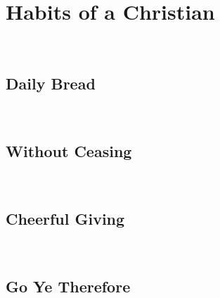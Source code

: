 \section{Habits of a Christian}
\noindent
\blindtext
\\

\subsection{Daily Bread}
\noindent
\blindtext
\\

\subsection{Without Ceasing}
\noindent
\blindtext
\\

\subsection{Cheerful Giving}
\noindent
\blindtext
\\

\subsection{Go Ye Therefore}
\noindent
\blindtext
\\
